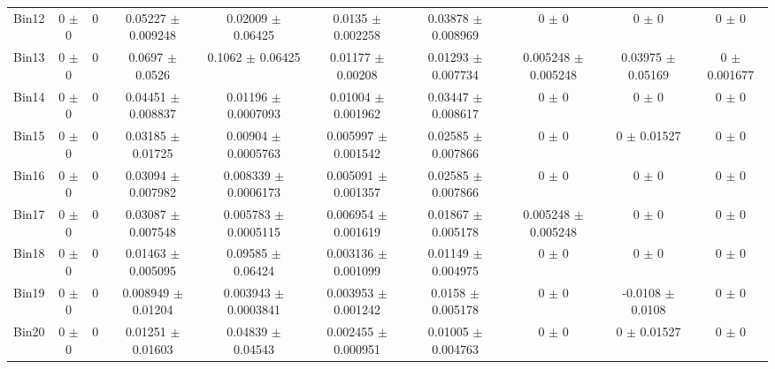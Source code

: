 \begin{tabular}{@{\extracolsep{4pt}}lccccccccc@{}}
     Bin12 & 0 $\pm$ 0 & 0 & 0.05227 $\pm$ 0.009248 & 0.02009 $\pm$ 0.06425 & 0.0135 $\pm$ 0.002258 & 0.03878 $\pm$ 0.008969 & 0 $\pm$ 0 & 0 $\pm$ 0 & 0 $\pm$ 0 \\ 
     Bin13 & 0 $\pm$ 0 & 0 & 0.0697 $\pm$ 0.0526 & 0.1062 $\pm$ 0.06425 & 0.01177 $\pm$ 0.00208 & 0.01293 $\pm$ 0.007734 & 0.005248 $\pm$ 0.005248 & 0.03975 $\pm$ 0.05169 & 0 $\pm$ 0.001677 \\ 
     Bin14 & 0 $\pm$ 0 & 0 & 0.04451 $\pm$ 0.008837 & 0.01196 $\pm$ 0.0007093 & 0.01004 $\pm$ 0.001962 & 0.03447 $\pm$ 0.008617 & 0 $\pm$ 0 & 0 $\pm$ 0 & 0 $\pm$ 0 \\ 
     Bin15 & 0 $\pm$ 0 & 0 & 0.03185 $\pm$ 0.01725 & 0.00904 $\pm$ 0.0005763 & 0.005997 $\pm$ 0.001542 & 0.02585 $\pm$ 0.007866 & 0 $\pm$ 0 & 0 $\pm$ 0.01527 & 0 $\pm$ 0 \\ 
     Bin16 & 0 $\pm$ 0 & 0 & 0.03094 $\pm$ 0.007982 & 0.008339 $\pm$ 0.0006173 & 0.005091 $\pm$ 0.001357 & 0.02585 $\pm$ 0.007866 & 0 $\pm$ 0 & 0 $\pm$ 0 & 0 $\pm$ 0 \\ 
     Bin17 & 0 $\pm$ 0 & 0 & 0.03087 $\pm$ 0.007548 & 0.005783 $\pm$ 0.0005115 & 0.006954 $\pm$ 0.001619 & 0.01867 $\pm$ 0.005178 & 0.005248 $\pm$ 0.005248 & 0 $\pm$ 0 & 0 $\pm$ 0 \\ 
     Bin18 & 0 $\pm$ 0 & 0 & 0.01463 $\pm$ 0.005095 & 0.09585 $\pm$ 0.06424 & 0.003136 $\pm$ 0.001099 & 0.01149 $\pm$ 0.004975 & 0 $\pm$ 0 & 0 $\pm$ 0 & 0 $\pm$ 0 \\ 
     Bin19 & 0 $\pm$ 0 & 0 & 0.008949 $\pm$ 0.01204 & 0.003943 $\pm$ 0.0003841 & 0.003953 $\pm$ 0.001242 & 0.0158 $\pm$ 0.005178 & 0 $\pm$ 0 & -0.0108 $\pm$ 0.0108 & 0 $\pm$ 0 \\ 
     Bin20 & 0 $\pm$ 0 & 0 & 0.01251 $\pm$ 0.01603 & 0.04839 $\pm$ 0.04543 & 0.002455 $\pm$ 0.000951 & 0.01005 $\pm$ 0.004763 & 0 $\pm$ 0 & 0 $\pm$ 0.01527 & 0 $\pm$ 0 \\ 
\hline\hline
  \end{tabular}
